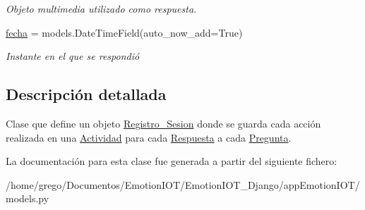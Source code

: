 \begin{DoxyCompactItemize}
\begin{DoxyCompactList}\small\item\em Objeto multimedia utilizado como respuesta. \end{DoxyCompactList}\item 
\hyperlink{classappEmotionIOT_1_1models_1_1Registro__Sesion_aa29e79206201a465671bcc5bdc05fc45}{fecha} = models.\+Date\+Time\+Field(auto\+\_\+now\+\_\+add=True)\hypertarget{classappEmotionIOT_1_1models_1_1Registro__Sesion_aa29e79206201a465671bcc5bdc05fc45}{}\label{classappEmotionIOT_1_1models_1_1Registro__Sesion_aa29e79206201a465671bcc5bdc05fc45}

\begin{DoxyCompactList}\small\item\em Instante en el que se respondió \end{DoxyCompactList}\end{DoxyCompactItemize}


\subsection{Descripción detallada}
Clase que define un objeto \hyperlink{classappEmotionIOT_1_1models_1_1Registro__Sesion}{Registro\+\_\+\+Sesion} donde se guarda cada acción realizada en una \hyperlink{classappEmotionIOT_1_1models_1_1Actividad}{Actividad} para cada \hyperlink{classappEmotionIOT_1_1models_1_1Respuesta}{Respuesta} a cada \hyperlink{classappEmotionIOT_1_1models_1_1Pregunta}{Pregunta}. 

La documentación para esta clase fue generada a partir del siguiente fichero\+:\begin{DoxyCompactItemize}
\item 
/home/grego/\+Documentos/\+Emotion\+I\+O\+T/\+Emotion\+I\+O\+T\+\_\+\+Django/app\+Emotion\+I\+O\+T/models.\+py\end{DoxyCompactItemize}
